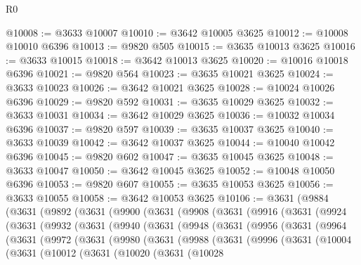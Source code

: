 \begin{lexlean}{R0}
\begin{coremodule}
@10008 := @3633 @10007
@10010 := @3642 @10005 @3625
@10012 := @10008 @10010 @6396
@10013 := @9820 @505
@10015 := @3635 @10013 @3625
@10016 := @3633 @10015
@10018 := @3642 @10013 @3625
@10020 := @10016 @10018 @6396
@10021 := @9820 @564
@10023 := @3635 @10021 @3625
@10024 := @3633 @10023
@10026 := @3642 @10021 @3625
@10028 := @10024 @10026 @6396
@10029 := @9820 @592
@10031 := @3635 @10029 @3625
@10032 := @3633 @10031
@10034 := @3642 @10029 @3625
@10036 := @10032 @10034 @6396
@10037 := @9820 @597
@10039 := @3635 @10037 @3625
@10040 := @3633 @10039
@10042 := @3642 @10037 @3625
@10044 := @10040 @10042 @6396
@10045 := @9820 @602
@10047 := @3635 @10045 @3625
@10048 := @3633 @10047
@10050 := @3642 @10045 @3625
@10052 := @10048 @10050 @6396
@10053 := @9820 @607
@10055 := @3635 @10053 @3625
@10056 := @3633 @10055
@10058 := @3642 @10053 @3625
@10106 := @3631
    (@9884
      (@3631
        (@9892
          (@3631
            (@9900
              (@3631
                (@9908
                  (@3631
                    (@9916
                      (@3631
                        (@9924
                          (@3631
                            (@9932
                              (@3631
                                (@9940
                                  (@3631
                                    (@9948
                                      (@3631
                                        (@9956
                                          (@3631
                                            (@9964
                                              (@3631
                                                (@9972
                                                  (@3631
                                                    (@9980
                                                      (@3631
                                                        (@9988
                                                          (@3631
                                                            (@9996
                                                              (@3631
                                                                (@10004
                                                                  (@3631
                                                                    (@10012
                                                                      (@3631
                                                                        (@10020
                                                                          (@3631
                                                                            (@10028

\end{coremodule}
\end{lexlean}
